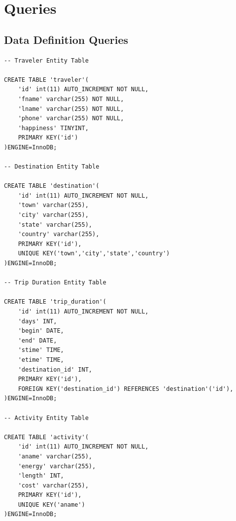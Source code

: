 \documentclass[letterpaper,10pt,onecolumn,compsoc]{IEEEtran}
\begin{document}
\section{Queries}

\subsection{Data Definition Queries}


\begin{verbatim}
-- Traveler Entity Table

CREATE TABLE 'traveler'(
	'id' int(11) AUTO_INCREMENT NOT NULL,
	'fname' varchar(255) NOT NULL,
	'lname' varchar(255) NOT NULL,
	'phone' varchar(255) NOT NULL,
	'happiness' TINYINT,
	PRIMARY KEY('id')
)ENGINE=InnoDB;

-- Destination Entity Table

CREATE TABLE 'destination'(
	'id' int(11) AUTO_INCREMENT NOT NULL,
	'town' varchar(255),
	'city' varchar(255),
	'state' varchar(255),
	'country' varchar(255),
	PRIMARY KEY('id'),
	UNIQUE KEY('town','city','state','country')
)ENGINE=InnoDB;

-- Trip Duration Entity Table

CREATE TABLE 'trip_duration'(
	'id' int(11) AUTO_INCREMENT NOT NULL,
	'days' INT,
	'begin' DATE,
	'end' DATE,
	'stime' TIME,
	'etime' TIME,
	'destination_id' INT,
	PRIMARY KEY('id'),
	FOREIGN KEY('destination_id') REFERENCES 'destination'('id'),
)ENGINE=InnoDB;

-- Activity Entity Table

CREATE TABLE 'activity'(
	'id' int(11) AUTO_INCREMENT NOT NULL,
	'aname' varchar(255),
	'energy' varchar(255),
	'length' INT,
	'cost' varchar(255),
	PRIMARY KEY('id'),
	UNIQUE KEY('aname')
)ENGINE=InnoDB;
\end{verbatim}

\newpage
\end{document}
